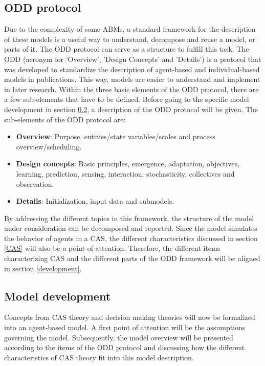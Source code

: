 \subsection{ODD protocol}
Due to the complexity of some ABMs, a standard framework for the description of these models is a useful way to understand, decompose and reuse a model, or parts of it. The ODD protocol can serve as a structure to fulfill this task. The ODD (acronym for 'Overview', 'Design Concepts' and 'Details') is a protocol that was developed to standardize the description of agent-based and individual-based models in publications. This way, models are easier to understand and implement in later research. Within the three basic elements of the ODD protocol, there are a few sub-elements that have to be defined. Before going to the specific model development in section \ref{MODEL}, a description of the ODD protocol will be given. The sub-elements of the ODD protocol are: 
\begin{itemize}
    \item \textbf{Overview}: Purpose, entities/state variables/scales and process overview/scheduling. 
    \item \textbf{Design concepts}: Basic principles, emergence, adaptation, objectives, learning, prediction, sensing, interaction, stochasticity, collectives and observation.
    \item \textbf{Details}: Initialization, input data and submodels.
\end{itemize}
By addressing the different topics in this framework, the structure of the model under consideration can be decomposed and reported. Since the model simulates the behavior of agents in a CAS, the different characteristics discussed in section \ref{CAS} will also be a point of attention. Therefore, the different items characterizing CAS and the different parts of the ODD framework will be aligned in section \ref{development}.
\subsection{Model development} \label{MODEL} \label{development}
Concepts from CAS theory and decision making theories will now be formalized into an agent-based model. A first point of attention will be the assumptions governing the model. Subsequently, the model overview will be presented according to the items of the ODD protocol and discussing how the different characteristics of CAS theory fit into this model description. 
